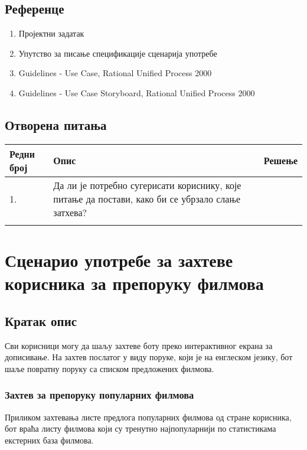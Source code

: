 \documentclass[12pt,a4paper]{article}
\begin{document}
\subsection{Референце}
 
\begin{enumerate}
  \item Пројектни задатак
  \item Упутство за писање спецификације сценарија употребе
  \item Guidelines - Use Case, Rational Unified Process 2000
  \item Guidelines - Use Case Storyboard, Rational Unified Process 2000
\end{enumerate}

\subsection{Отворена питања}

\noindent
\setcellgapes{4pt}
\makegapedcells
\begin{tabularx}{\linewidth}{|l|X|X|}
    \hline
    \textbf{Редни број} & \textbf{Опис} & \textbf{Решење} \\
    \hline
    1. & Да ли је потребно сугерисати кориснику, које питање да постави, како би се убрзало слање затхева? &  \\
    \hline
    & &  \\
    \hline
\end{tabularx}
\section{Сценарио употребе за захтеве корисника за препоруку филмова}
\subsection{Кратак опис}
Сви корисници могу да шаљу захтеве боту преко интерактивног екрана за дописивање. На захтев послатог у виду
поруке, који је на енглеском језику, бот шаље повратну поруку са списком предложених филмова.


\subsubsection{Захтев за препоруку популарних филмова}

Приликом захтевања листе предлога популарних филмова од стране корисника, бот враћа листу филмова који су
тренутно најпопуларнији по статистикама екстерних база филмова.
\end{document}
